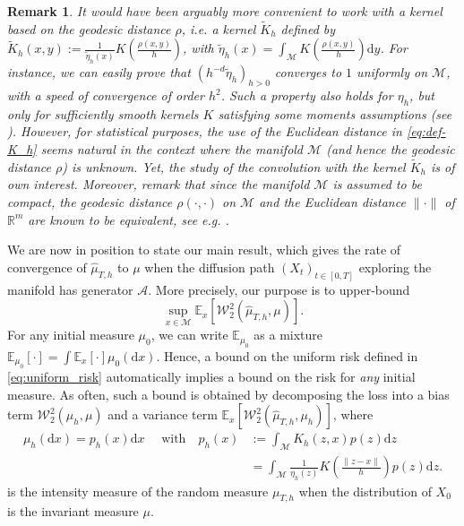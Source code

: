 \documentclass[10pt,a4paper]{article}
\newcommand{\E}{{\mathbb E}}
\newcommand{\R}{{\mathbb R}}
\newcommand\cA{\mathcal{A}}
\newcommand\cM{\mathcal{M}}
\newcommand\W{\mathcal{W}}
\newcommand\dd{\mathrm{d}}
\newcommand{\NRM}[1]{{{\left\| #1\right\|}}} %
\newcommand{\PAR}[1]{{{\left(#1\right)}}} %
\newcommand{\SBRA}[1]{{{\left[#1\right]}}} %
\newtheorem{remark}[theorem]{Remark}
\begin{document}
\begin{remark}\label{rk:K-geodesic}
    It would have been arguably more convenient to work with a kernel based on the geodesic distance $\rho$, i.e. a kernel $\widetilde{K}_h$ defined by $\widetilde{K}_h(x,y):=\frac{1}{\tilde{\eta}_h(x)}K\PAR{\frac{\rho(x,y)}{h}}$, 
with $\widetilde{\eta}_h(x)=\int_\cM K\PAR{\frac{\rho(x,y)}{h}}\dd y $. For instance,  we can easily prove  that $\PAR{h^{-d}\widetilde{\eta}_h}_{h>0}$ converges to $1$ uniformly on $\cM$, with a speed of convergence of order $h^2$. Such a property also holds for $\eta_h$, but only for sufficiently smooth  kernels $K$ satisfying some moments assumptions (see ). 
 However, for statistical purposes, the use of the Euclidean distance in \eqref{eq:def-K_h} seems natural in the context where the manifold $\cM$ (and hence the geodesic distance $\rho$) is unknown. Yet, the study of the convolution with the kernel $\widetilde{K}_h$ 
is of own interest. Moreover,  remark that since  the manifold $\cM$ is assumed to be compact, the geodesic distance $\rho(\cdot,\cdot)$ on $\cM$ and the Euclidean distance $\| \cdot \|$ of $\R^m$ are known to be equivalent, see e.g. \cite[Proposition 2]{Trillos2020}.
\end{remark}



We are now in position to state our main result, which gives the rate of convergence of $\widehat{\mu}_{T,h}$ to $\mu$ when the diffusion path $(X_t)_{t\in[0,T]}$  exploring the manifold has generator $\cA$. More precisely, our purpose is to upper-bound
\begin{equation}\label{eq:uniform_risk}
    \sup_{x \in \cM } \mathbb{E}_x\SBRA{\W_2^2(\widehat{\mu}_{T,h},\mu)}.
\end{equation} 
For any initial measure $\mu_0$, we can write $\E_{\mu_0}$ as a mixture $\E_{\mu_0}[\cdot ]  = \int \E_x [ \cdot ]  \mu_0(\dd x)$. Hence, a bound on the uniform risk defined in \eqref{eq:uniform_risk} automatically implies a bound on the risk for \textit{any} initial measure. 
As often, such a bound is obtained by decomposing the loss into a bias term $\W_2^2(\mu_h,\mu)$  and a variance term $\mathbb{E}_x\SBRA{\W_2^2(\widehat{\mu}_{T,h},\mu_h)}$, where 
\begin{align}
	\label{eq:def_convol} \mu_h(\dd x)=p_h(x)\dd x \quad \text{ with}\quad p_h(x)&:=%
	\int_\cM K_h\PAR{z,x}p(z)\dd z\\
 &=\int_\cM\frac{1}{\eta_h(z)}K\PAR{\frac{\NRM{z-x}}{h}}p(z)\dd z .\nonumber
\end{align}
is the intensity measure of the random measure $\mu_{T,h}$ when the distribution of $X_0$ is the invariant measure $\mu$. 
\end{document}
